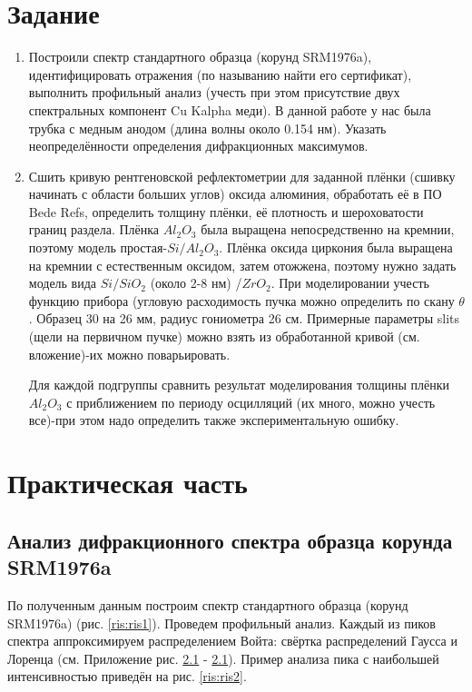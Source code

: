 \documentclass[a4paper]{article}
\begin{document}
\newpage
\tableofcontents
\newpage
\section{Задание}
\begin{enumerate}
    \item Построили спектр стандартного образца (корунд SRM1976a), идентифицировать отражения (по называнию найти его сертификат), выполнить профильный анализ (учесть при этом присутствие двух спектральных компонент Cu Kalpha меди). В данной работе у нас была трубка с медным анодом (длина волны около 0.154 нм). Указать неопределённости определения дифракционных максимумов.
    \item 	Сшить кривую рентгеновской рефлектометрии для заданной плёнки (сшивку начинать с области больших углов) оксида алюминия, обработать её в ПО Bede Refs, определить толщину плёнки, её плотность и шероховатости границ раздела. Плёнка $Al_2 O_3$ была выращена непосредственно на кремнии, поэтому модель простая-$Si/Al_2 O_3$. Плёнка оксида циркония была выращена на кремнии с естественным оксидом, затем отожжена, поэтому нужно задать модель вида $Si/SiO_2$ (около 2-8 нм) /$ZrO_2$. При моделировании учесть функцию прибора (угловую расходимость пучка можно определить по скану $\theta$. Образец 30 на 26 мм, радиус гониометра 26 см. Примерные параметры slits (щели на первичном пучке) можно взять из обработанной кривой (см. вложение)-их можно поварьировать.

    Для каждой подгруппы сравнить результат моделирования толщины плёнки $Al_2 O_3$ с приближением по периоду осцилляций (их много, можно учесть все)-при этом надо определить также экспериментальную ошибку.

\end{enumerate}


\newpage
\section{Практическая часть}
\subsection{Анализ дифракционного спектра образца корунда SRM1976a}
По полученным данным построим спектр стандартного образца (корунд SRM1976a) (рис. \ref{ris:ris1}). Проведем профильный анализ. Каждый из пиков спектра аппроксимируем распределением Войта: свёртка распределений Гаусса и Лоренца (см. Приложение рис. \ref{} - \ref{}). Пример анализа пика с наибольшей интенсивностью приведён на рис. \ref{ris:ris2}.
\end{document}
